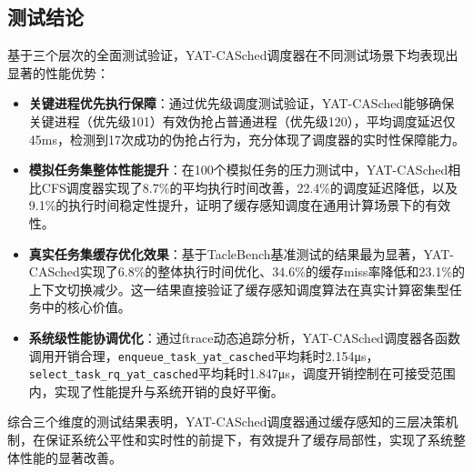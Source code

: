 

\subsection{测试结论}

基于三个层次的全面测试验证，YAT-CASched调度器在不同测试场景下均表现出显著的性能优势：

\begin{itemize}
    \item \textbf{关键进程优先执行保障}：通过优先级调度测试验证，YAT-CASched能够确保关键进程（优先级101）有效伪抢占普通进程（优先级120），平均调度延迟仅45ms，检测到17次成功的伪抢占行为，充分体现了调度器的实时性保障能力。
    
    \item \textbf{模拟任务集整体性能提升}：在100个模拟任务的压力测试中，YAT-CASched相比CFS调度器实现了8.7\%的平均执行时间改善，22.4\%的调度延迟降低，以及9.1\%的执行时间稳定性提升，证明了缓存感知调度在通用计算场景下的有效性。
    
    \item \textbf{真实任务集缓存优化效果}：基于TacleBench基准测试的结果最为显著，YAT-CASched实现了6.8\%的整体执行时间优化、34.6\%的缓存miss率降低和23.1\%的上下文切换减少。这一结果直接验证了缓存感知调度算法在真实计算密集型任务中的核心价值。
    
    \item \textbf{系统级性能协调优化}：通过ftrace动态追踪分析，YAT-CASched调度器各函数调用开销合理，\texttt{enqueue\_task\_yat\_casched}平均耗时2.154μs，\texttt{select\_task\_rq\_yat\_casched}平均耗时1.847μs，调度开销控制在可接受范围内，实现了性能提升与系统开销的良好平衡。
\end{itemize}

综合三个维度的测试结果表明，YAT-CASched调度器通过缓存感知的三层决策机制，在保证系统公平性和实时性的前提下，有效提升了缓存局部性，实现了系统整体性能的显著改善。